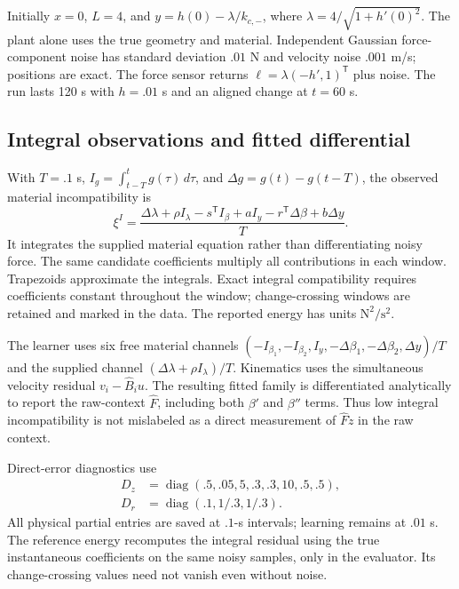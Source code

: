 \documentclass[journal]{IEEEtran}
\begin{document}
Initially $x=0$, $L=4$, and
$y=h(0)-\lambda/k_{c,-}$, where
$\lambda=4/\sqrt{1+h'(0)^2}$. The plant alone uses the true geometry and
material. Independent Gaussian force-component noise has standard deviation
$.01$ N and velocity noise $.001$ m/s; positions are exact. The force sensor
returns $\ell=\lambda(-h',1)^{\mathsf T}$ plus noise. The run lasts 120 s with
$h=.01$ s and an aligned change at $t=60$ s.

\subsection{Integral observations and fitted differential}
With $T=.1$ s, $I_g=\int_{t-T}^t g(\tau)\,d\tau$, and
$\Delta g=g(t)-g(t-T)$, the observed material incompatibility is
\begin{equation}
 \xi^I=\frac{\Delta\lambda+\rho I_\lambda
 -s^{\mathsf T}I_\beta+aI_y-r^{\mathsf T}\Delta\beta+b\Delta y}{T}.
 \label{eq:integral}
\end{equation}
It integrates the supplied material equation rather than differentiating
noisy force. The same candidate coefficients multiply all contributions in
each window. Trapezoids approximate the integrals. Exact integral
compatibility requires coefficients constant throughout the window;
change-crossing windows are retained and marked in the data. The reported
energy has units $\mathrm{N}^2/\mathrm{s}^2$.

The learner uses six free material channels
$(-I_{\beta_1},-I_{\beta_2},I_y,-\Delta\beta_1,-\Delta\beta_2,\Delta y)/T$
and the supplied channel $(\Delta\lambda+\rho I_\lambda)/T$.
Kinematics uses the simultaneous velocity residual $v_i-\widehat B_i u$.
The resulting fitted family is differentiated analytically to report the
raw-context $\widehat F$, including both $\beta'$ and $\beta''$ terms.
Thus low integral incompatibility is not mislabeled as a direct measurement
of $\widehat F\dot z$ in the raw context.

Direct-error diagnostics use
\begin{align*}
 D_z&=\operatorname{diag}(.5,.05,5,.3,.3,10,.5,.5),\\
 D_r&=\operatorname{diag}(.1,1/.3,1/.3).
\end{align*}
All physical partial entries are saved at $.1$-s intervals; learning remains
at $.01$ s. The reference energy recomputes the integral residual using the
true instantaneous coefficients on the same noisy samples, only in the
evaluator. Its change-crossing values need not vanish even without noise.
\end{document}
